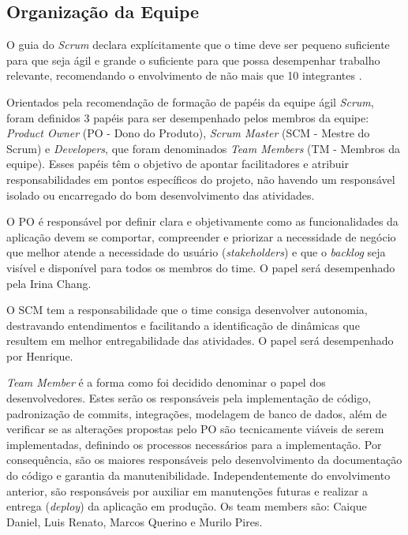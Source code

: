 \documentclass[
    12pt,               %
    openright,          %
    oneside,
    a4paper,            %
    BIBLATEX,           %
    TODO,               %
    english,            %
    brazil              %
    ]{ifsp-spo-inf-ctds}
\begin{document}
        \subsection{Organização da Equipe}
            
            O guia do \emph{Scrum} declara explícitamente que o time deve ser pequeno suficiente para que seja ágil e grande o suficiente para que possa desempenhar trabalho relevante, recomendando o envolvimento de não mais que 10 integrantes .
            
            Orientados pela recomendação de formação de papéis da equipe ágil \emph{Scrum}, foram definidos 3 papéis para ser desempenhado pelos membros da equipe: \emph{Product Owner} (PO -  Dono do Produto), \emph{Scrum Master} (SCM - Mestre do Scrum) e \emph{Developers}, que foram denominados \emph{Team Members} (TM - Membros da equipe). Esses papéis têm o objetivo de apontar facilitadores e atribuir responsabilidades em pontos específicos do projeto, não havendo um responsável isolado ou encarregado do bom desenvolvimento das atividades. 
            
            O PO é responsável por definir clara e objetivamente como as funcionalidades da aplicação devem se comportar, compreender e priorizar a necessidade de negócio que melhor atende a necessidade do usuário (\emph{stakeholders}) e que o \emph{backlog }seja visível e disponível para todos os membros do time. O papel será desempenhado pela Irina Chang.
            
            O SCM tem a responsabilidade que o time consiga desenvolver autonomia, destravando entendimentos e facilitando a identificação de dinâmicas que resultem em melhor entregabilidade das atividades. O papel será desempenhado por Henrique.
            
            \emph{Team Member} é a forma como foi decidido denominar o papel dos desenvolvedores. Estes serão os responsáveis pela implementação de código, padronização de commits, integrações, modelagem de banco de dados, além de verificar se as alterações propostas pelo PO são tecnicamente viáveis de serem implementadas, definindo os processos necessários para a implementação. Por consequência, são os maiores responsáveis pelo desenvolvimento da documentação do código e garantia da manutenibilidade. Independentemente do envolvimento anterior, são responsáveis por auxiliar em  manutenções futuras e realizar a entrega (\emph{deploy}) da aplicação em produção. Os team members são: Caique Daniel, Luis Renato, Marcos Querino e Murilo Pires.
            
\end{document}
